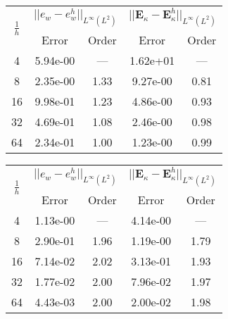 \begin{table}[hp]
	\centering
	\begin{tabular}{ccccc}
		\hline 
		\multirow{2}{*}{$\frac{1}{h}$} & \multicolumn{2}{c}{$||e_w - e_w^h||_{L^{\infty}(L^2)}$}  & \multicolumn{2}{c}{$||\bm{E}_\kappa - \bm{E}_\kappa^h||_{L^{\infty}(L^2)}$}   \\ 
		& Error & Order  & Error & Order  \\
		\hline 
		4  & 5.94e-00 & ---  & 1.62e+01 & ---  \\ 
		8  & 2.35e-00 & 1.33 & 9.27e-00 & 0.81 \\ 
		16 & 9.98e-01 & 1.23 & 4.86e-00 & 0.93 \\ 
		32 & 4.69e-01 & 1.08 & 2.46e-00 & 0.98 \\ 
		64 & 2.34e-01 & 1.00 & 1.23e-00 & 0.99 \\ 
		\hline 
	\end{tabular} 
	\captionsetup{width=0.95\linewidth}
	\vspace{1mm}
	\label{tab:resminHHJ_CSFS_k1}
\end{table}

\begin{table}[hp]
	\centering
	\begin{tabular}{ccccc}
		\hline 
		\multirow{2}{*}{$\frac{1}{h}$} & \multicolumn{2}{c}{$||e_w - e_w^h||_{L^{\infty}(L^2)}$}  & \multicolumn{2}{c}{$||\bm{E}_\kappa - \bm{E}_\kappa^h||_{L^{\infty}(L^2)}$}   \\ 
		& Error & Order  & Error & Order  \\
		\hline 
		4  & 1.13e-00 & ---  & 4.14e-00 & ---  \\ 
		8  & 2.90e-01 & 1.96 & 1.19e-00 & 1.79 \\ 
		16 & 7.14e-02 & 2.02 & 3.13e-01 & 1.93 \\ 
		32 & 1.77e-02 & 2.00 & 7.96e-02 & 1.97 \\ 
		64 & 4.43e-03 & 2.00 & 2.00e-02 & 1.98 \\ 
		\hline 
	\end{tabular} 
	\captionsetup{width=0.95\linewidth}
	\vspace{1mm}
	\label{tab:resminHHJ_CSFS_k2}
\end{table}

